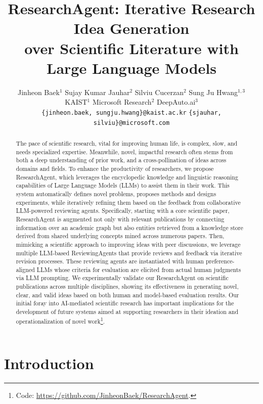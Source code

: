 \documentclass[11pt]{article}
\title{ResearchAgent: Iterative Research Idea Generation \\ over Scientific Literature with Large Language Models}
\author{
    Jinheon Baek$^1$ \; 
    Sujay Kumar Jauhar$^2$ \; 
    Silviu Cucerzan$^2$ \; 
    Sung Ju Hwang$^{1,3}$ \\
    KAIST$^1$ \;\; Microsoft Research$^2$ \;\; DeepAuto.ai$^3$ \\
    \texttt{\{jinheon.baek, sungju.hwang\}@kaist.ac.kr} \; \texttt{\{sjauhar, silviu\}@microsoft.com}
}
\begin{document}
\maketitle


\begin{abstract}

The pace of scientific research, vital for improving human life, is complex, slow, and needs specialized expertise. Meanwhile, novel, impactful research often stems from both a deep understanding of prior work, and a cross-pollination of ideas across domains and fields. To enhance the productivity of researchers, we propose ResearchAgent, which leverages the encyclopedic knowledge and linguistic reasoning capabilities of Large Language Models (LLMs) to assist them in their work. This system automatically defines novel problems, proposes methods and designs experiments, while iteratively refining them based on the feedback from collaborative LLM-powered reviewing agents. Specifically, starting with a core scientific paper, ResearchAgent is augmented not only with relevant publications by connecting information over an academic graph but also entities retrieved from a knowledge store derived from shared underlying concepts mined across numerous papers. Then, mimicking a scientific approach to improving ideas with peer discussions, we leverage multiple LLM-based ReviewingAgents that provide reviews and feedback via iterative revision processes. These reviewing agents are instantiated with human preference-aligned LLMs whose criteria for evaluation are elicited from actual human judgments via LLM prompting. We experimentally validate our ResearchAgent on scientific publications across multiple disciplines, showing its effectiveness in generating novel, clear, and valid ideas based on both human and model-based evaluation results. Our initial foray into AI-mediated scientific research has important implications for the development of future systems aimed at supporting researchers in their ideation and operationalization of novel work\footnote{Code: \href{https://github.com/JinheonBaek/ResearchAgent}{https://github.com/JinheonBaek/ResearchAgent}.}. 

\end{abstract}


\section{Introduction}
\end{document}
